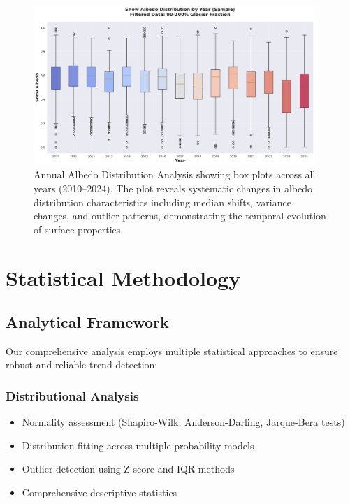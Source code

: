 \documentclass[12pt,a4paper]{article}
\begin{document}
\begin{figure}[H]
\centering
\includegraphics[width=0.95\textwidth]{../../results/plots/distribution_all_years.png}
\caption{Annual Albedo Distribution Analysis showing box plots across all years (2010--2024). The plot reveals systematic changes in albedo distribution characteristics including median shifts, variance changes, and outlier patterns, demonstrating the temporal evolution of surface properties.}
\label{fig:annual_distributions}
\end{figure}

\section{Statistical Methodology}

\subsection{Analytical Framework}

Our comprehensive analysis employs multiple statistical approaches to ensure robust and reliable trend detection:

\subsubsection{Distributional Analysis}
\begin{itemize}
    \item Normality assessment (Shapiro-Wilk, Anderson-Darling, Jarque-Bera tests)
    \item Distribution fitting across multiple probability models
    \item Outlier detection using Z-score and IQR methods
    \item Comprehensive descriptive statistics
\end{itemize}
\end{document}
